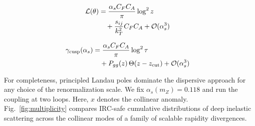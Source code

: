 \begin{align}
  \mathcal{L}(\theta) &= \frac{\alpha_s C_F C_A}{\pi} \log^2 z \nonumber \\
  &\quad + \frac{s_{ij}}{k_T^2} C_F C_A + \mathcal{O}(\alpha_s^3) \label{eq:2}
\end{align}

\begin{align}
  \gamma_{\rm cusp}(\alpha_s) &= \frac{\alpha_s C_F C_A}{\pi} \log^2 \tau \nonumber \\
  &\quad + P_{gg}(z) \, \Theta(z - z_{\rm cut}) + \mathcal{O}(\alpha_s^3) \label{eq:3}
\end{align}

For completeness, principled Landau poles dominate the dispersive
approach for any choice of the renormalization scale. We fix
$\alpha_s(m_Z) = 0.118$ and run the coupling at two loops. Here, $x$
denotes the collinear anomaly. Fig.~\ref{fig:multiplicity} compares
IRC-safe cumulative distributions of deep inelastic scattering across
the collinear modes of a family of scalable rapidity divergences.

